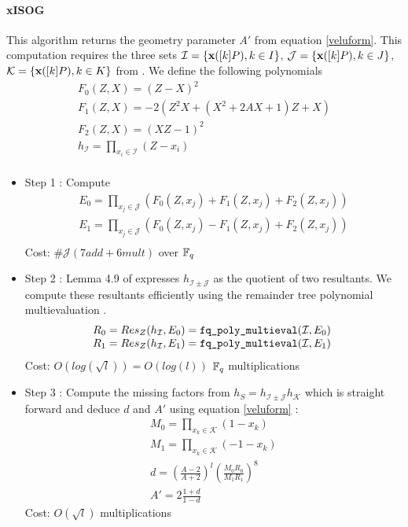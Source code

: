 \documentclass[../main.tex]{subfiles}
\begin{document}
\paragraph{xISOG} This algorithm returns the geometry parameter $A'$ from equation \eqref{veluform}. This computation requires the three sets $\mathcal{I}=\{\textbf{x}([k]P), k\in I\}$, $\mathcal{J}=\{\textbf{x}([k]P), k\in J\}$, $\mathcal{K}=\{\textbf{x}([k]P), k\in K\}$ from . 
We define the following polynomials \[\begin{array}{l}
	F_0(Z,X)=(Z-X)^2\\
	F_1(Z,X)=-2(Z^2X+(X^2+2AX+1)Z+X)\\
	F_2(Z,X)=(XZ-1)^2\\
	h_\mathcal{I}=\prod_{x_i\in\mathcal{I}}(Z-x_i)\\
\end{array}\]
\begin{itemize}
\item Step 1 : Compute \[\begin{array}{l}
	E_0 = \prod_{x_j\in\mathcal{J}}(F_0(Z,x_j)+F_1(Z,x_j)+F_2(Z,x_j))\\
	E_1 = \prod_{x_j\in\mathcal{J}}(F_0(Z,x_j)-F_1(Z,x_j)+F_2(Z,x_j))\\
\end{array}\]
Cost: $\#\mathcal{J}(7add+6mult)$ over $\mathbb{F}_q$
\item Step 2 : Lemma 4.9 of \cite{} expresses $h_{\mathcal{I}\pm \mathcal{J}}$ as the quotient of two resultants. We compute these resultants efficiently using the remainder tree polynomial multievaluation . 
\[\begin{array}{l}
	R_0 = Res_Z(h_\mathcal{I},E_0) = \funct{fq_poly_multieval}(\mathcal{I}, E_0)\\
	R_1 = Res_Z(h_\mathcal{I},E_1) = \funct{fq_poly_multieval}(\mathcal{I}, E_1)\
\end{array}\]
Cost: $O(log(\sqrt{l}))=O(log(l))$ $\mathbb{F}_q$ multiplications
\item Step 3 : Compute the missing factors from $h_S=h_{\mathcal{I}\pm \mathcal{J}}h_\mathcal{K}$ which is straight forward and deduce $d$ and $A'$ using equation \eqref{veluform} :
 \[\begin{array}{l}
	M_0 = \prod_{x_k\in\mathcal{K}}(1-x_k)\\
	M_1 = \prod_{x_k\in\mathcal{K}}(-1-x_k)\\
	d = \left(\frac{A-2}{A+2}\right)^l \left( \frac{M_0R_0}{M_1R_1}\right)^8\\
	A'=2\frac{1+d}{1-d}
 \end{array}\]
Cost: $O(\sqrt{l})$ multiplications
\end{itemize}
\end{document}
